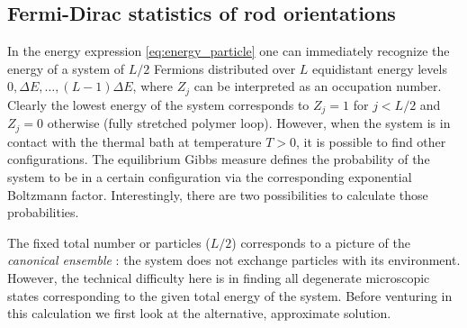 \documentclass[aps,showpacs,twocolumn,floatfix,prx,superscriptaddress]{revtex4-1}
\begin{document}
\subsection{Fermi-Dirac statistics of rod orientations}
In the energy expression \eqref{eq:energy_particle} one can immediately recognize
the energy of a system of $L/2$ Fermions distributed over
$L$ equidistant energy levels $0, \Delta E, \ldots, (L-1) \Delta E$, where
$Z_j$ can be interpreted as an occupation number. Clearly the lowest energy of the system corresponds to $Z_j = 1$ for $j < L/2$ and
$Z_j=0$ otherwise (fully stretched polymer loop). However, when the system is in contact with the thermal bath
at temperature $T>0$, it is possible to find other configurations. The equilibrium
Gibbs measure defines the probability of the system to be in a certain configuration via the corresponding exponential Boltzmann factor.
Interestingly, there are two possibilities to calculate those probabilities. 


The fixed total number or particles ($L/2$) corresponds to a picture of the
\emph{canonical ensemble} \cite{Chandler1987,Huang2001}: the system does not exchange particles with
its environment. However, the technical difficulty here is in finding all degenerate microscopic states corresponding to the given total energy of the system. Before venturing in this calculation we first look at the alternative, approximate solution.

\end{document}
